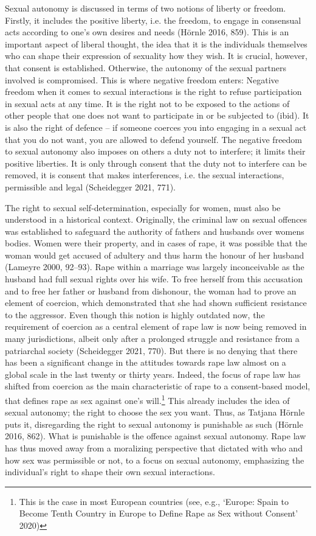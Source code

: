 Sexual autonomy is discussed in terms of two notions of liberty or
freedom. Firstly, it includes the positive liberty, i.e. the freedom, to
engage in consensual acts according to one's own desires and needs
(Hörnle 2016, 859). This is an important aspect of liberal thought, the
idea that it is the individuals themselves who can shape their
expression of sexuality how they wish. It is crucial, however, that
consent is established. Otherwise, the autonomy of the sexual partners
involved is compromised. This is where negative freedom enters: Negative
freedom when it comes to sexual interactions is the right to refuse
participation in sexual acts at any time. It is the right not to be
exposed to the actions of other people that one does not want to
participate in or be subjected to (ibid). It is also the right of
defence -- if someone coerces you into engaging in a sexual act that you
do not want, you are allowed to defend yourself. The negative freedom to
sexual autonomy also imposes on others a duty not to interfere; it
limits their positive liberties. It is only through consent that the
duty not to interfere can be removed, it is consent that makes
interferences, i.e. the sexual interactions, permissible and legal
(Scheidegger 2021, 771).

The right to sexual self-determination, especially for women, must also
be understood in a historical context. Originally, the criminal law on
sexual offences was established to safeguard the authority of fathers
and husbands over women\textquotesingle s bodies. Women were their
property, and in cases of rape, it was possible that the woman would get
accused of adultery and thus harm the honour of her husband (Lameyre
2000, 92--93). Rape within a marriage was largely inconceivable as the
husband had full sexual rights over his wife. To free herself from this
accusation and to free her father or husband from dishonour, the woman
had to prove an element of coercion, which demonstrated that she had
shown sufficient resistance to the aggressor. Even though this notion is
highly outdated now, the requirement of coercion as a central element of
rape law is now being removed in many jurisdictions, albeit only after a
prolonged struggle and resistance from a patriarchal society
(Scheidegger 2021, 770). But there is no denying that there has been a
significant change in the attitudes towards rape law almost on a global
scale in the last twenty or thirty years. Indeed, the focus of rape law
has shifted from coercion as the main characteristic of rape to a
consent-based model, that defines rape as sex against one's
will.\footnote{This is the case in most European countries (see, e.g.,
  `Europe: Spain to Become Tenth Country in Europe to Define Rape as Sex
  without Consent' 2020)} This already includes the idea of sexual
autonomy; the right to choose the sex you want. Thus, as Tatjana Hörnle
puts it, disregarding the right to sexual autonomy is punishable as such
(Hörnle 2016, 862). What is punishable is the offence against sexual
autonomy. Rape law has thus moved away from a moralizing perspective
that dictated with who and how sex was permissible or not, to a focus on
sexual autonomy, emphasizing the individual's right to shape their own
sexual interactions.

